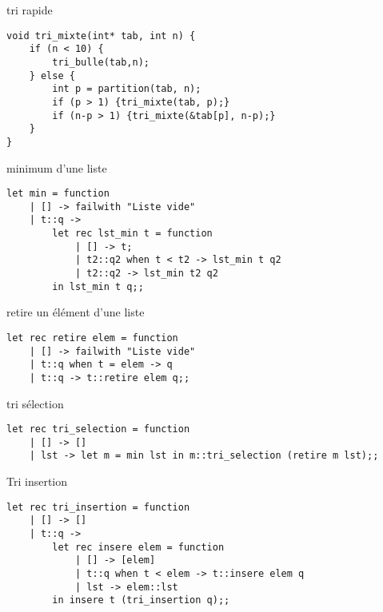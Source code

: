 \begin{fnc*}{tri rapide}
\begin{verbatim}
void tri_mixte(int* tab, int n) {
    if (n < 10) {
        tri_bulle(tab,n);
    } else {
        int p = partition(tab, n);
        if (p > 1) {tri_mixte(tab, p);}
        if (n-p > 1) {tri_mixte(&tab[p], n-p);}
    }
}
\end{verbatim}
\end{fnc*}
\ocaml
\begin{fnc*}{minimum d'une liste}
\begin{verbatim}
let min = function
    | [] -> failwith "Liste vide"
    | t::q ->
        let rec lst_min t = function
            | [] -> t;
            | t2::q2 when t < t2 -> lst_min t q2
            | t2::q2 -> lst_min t2 q2
        in lst_min t q;;
\end{verbatim}
\end{fnc*}
\begin{fnc*}{retire un élément d'une liste}
\begin{verbatim}
let rec retire elem = function
    | [] -> failwith "Liste vide"
    | t::q when t = elem -> q
    | t::q -> t::retire elem q;;
\end{verbatim}
\end{fnc*}
\begin{fnc*}{tri sélection}
\begin{verbatim}
let rec tri_selection = function
    | [] -> []
    | lst -> let m = min lst in m::tri_selection (retire m lst);;
\end{verbatim}
\end{fnc*}
\begin{fnc*}{Tri insertion}
\begin{verbatim}
let rec tri_insertion = function
    | [] -> []
    | t::q ->
        let rec insere elem = function
            | [] -> [elem]
            | t::q when t < elem -> t::insere elem q
            | lst -> elem::lst
        in insere t (tri_insertion q);;
\end{verbatim}
\end{fnc*}
